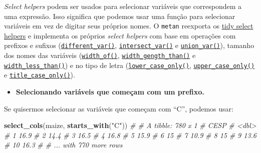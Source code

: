 \documentclass[
]{book}
\newenvironment{Shaded}{\begin{snugshade}}{\end{snugshade}}
\newcommand{\CommentTok}[1]{\textcolor[rgb]{0.56,0.35,0.01}{\textit{#1}}}
\newcommand{\KeywordTok}[1]{\textcolor[rgb]{0.13,0.29,0.53}{\textbf{#1}}}
\newcommand{\NormalTok}[1]{#1}
\newcommand{\StringTok}[1]{\textcolor[rgb]{0.31,0.60,0.02}{#1}}
\providecommand{\tightlist}{%
  \setlength{\itemsep}{0pt}\setlength{\parskip}{0pt}}
\numberwithin{equation}{section}
\begin{document}
\emph{Select helpers} podem ser usados para selecionar variáveis que correspondem a uma expressão. Isso significa que podemos usar uma função para selecionar variáveis em vez de digitar seus próprios nomes. O \texttt{metan} reexporta os \href{https://tidyselect.r-lib.org/reference/select_helpers.html}{tidy select helpers} e implementa os próprios \emph{select helpers} com base em operações com prefixos e sufixos (\href{https://tiagoolivoto.github.io/metan/reference/Select_helper.html}{\texttt{different\_var()}}, \href{https://tiagoolivoto.github.io/metan/reference/Select_helper.html}{\texttt{intersect\_var()}} e \href{https://tiagoolivoto.github.io/metan/reference/Select_helper.html}{\texttt{union\_var()}}), tamanho dos nomes das variáveis (\href{https://tiagoolivoto.github.io/metan/\%20reference\%20/\%20Select_helper.html}{\texttt{width\_of()}}, \href{https://tiagoolivoto.github.io/metan/reference/Select_helper.html}{\texttt{width\_gength\_than()}} e \href{https:\%20//tiagoolivoto.github\%20.io\%20/\%20metan\%20/\%20reference\%20/\%20Select_helper.html}{\texttt{width\_less\_than()}}) e no tipo de letra (\href{https://tiagoolivoto.github.io/metan/reference/Select_helper.html}{\texttt{lower\_case\_only()}}, \href{https://tiagoolivoto.github.io/metan/reference/Select_helper.html}{\texttt{upper\_case\_only()}} e \href{https:\%20//tiagoolivoto.github\%20.io\%20/\%20metan\%20/\%20reference\%20/\%20Select_helper.html}{\texttt{title\_case\_only()}}).

\begin{itemize}
\tightlist
\item
  \textbf{Selecionando variáveis que começam com um prefixo.}
\end{itemize}

Se quisermos selecionar as variáveis que começam com ``C'', podemos usar:

\begin{Shaded}
\begin{Highlighting}[]
\KeywordTok{select\_cols}\NormalTok{(maize, }\KeywordTok{starts\_with}\NormalTok{(}\StringTok{"C"}\NormalTok{))}
\CommentTok{\# \# A tibble: 780 x 1}
\CommentTok{\#     CESP}
\CommentTok{\#    \textless{}dbl\textgreater{}}
\CommentTok{\#  1  16.9}
\CommentTok{\#  2  14.4}
\CommentTok{\#  3  16.5}
\CommentTok{\#  4  16.8}
\CommentTok{\#  5  15.9}
\CommentTok{\#  6  15  }
\CommentTok{\#  7  10.9}
\CommentTok{\#  8  15  }
\CommentTok{\#  9  13.6}
\CommentTok{\# 10  16.3}
\CommentTok{\# \# ... with 770 more rows}
\end{Highlighting}
\end{Shaded}
\end{document}
